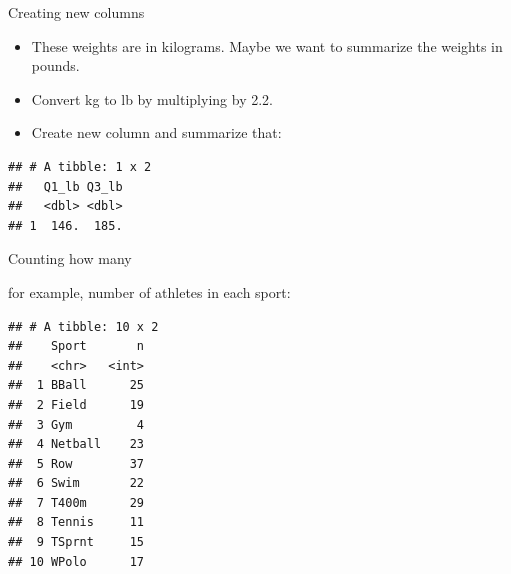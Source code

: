 \documentclass[
  ignorenonframetext,
]{beamer}
\newenvironment{Shaded}{\begin{snugshade}}{\end{snugshade}}
\newcommand{\DataTypeTok}[1]{\textcolor[rgb]{0.13,0.29,0.53}{#1}}
\newcommand{\FloatTok}[1]{\textcolor[rgb]{0.00,0.00,0.81}{#1}}
\newcommand{\KeywordTok}[1]{\textcolor[rgb]{0.13,0.29,0.53}{\textbf{#1}}}
\newcommand{\NormalTok}[1]{#1}
\newcommand{\OperatorTok}[1]{\textcolor[rgb]{0.81,0.36,0.00}{\textbf{#1}}}
\newcommand{\StringTok}[1]{\textcolor[rgb]{0.31,0.60,0.02}{#1}}
\providecommand{\tightlist}{%
  \setlength{\itemsep}{0pt}\setlength{\parskip}{0pt}}
\begin{document}
\begin{frame}[fragile]{Creating new columns}
\protect\hypertarget{creating-new-columns}{}

\begin{itemize}
\tightlist
\item
  These weights are in kilograms. Maybe we want to summarize the weights
  in pounds.
\item
  Convert kg to lb by multiplying by 2.2.
\item
  Create new column and summarize that:
\end{itemize}

\begin{Shaded}
\end{Shaded}

\begin{verbatim}
## # A tibble: 1 x 2
##   Q1_lb Q3_lb
##   <dbl> <dbl>
## 1  146.  185.
\end{verbatim}

\end{frame}

\begin{frame}[fragile]{Counting how many}
\protect\hypertarget{counting-how-many}{}

for example, number of athletes in each sport:

\begin{Shaded}
\end{Shaded}

\begin{verbatim}
## # A tibble: 10 x 2
##    Sport       n
##    <chr>   <int>
##  1 BBall      25
##  2 Field      19
##  3 Gym         4
##  4 Netball    23
##  5 Row        37
##  6 Swim       22
##  7 T400m      29
##  8 Tennis     11
##  9 TSprnt     15
## 10 WPolo      17
\end{verbatim}

\end{frame}
\end{document}
